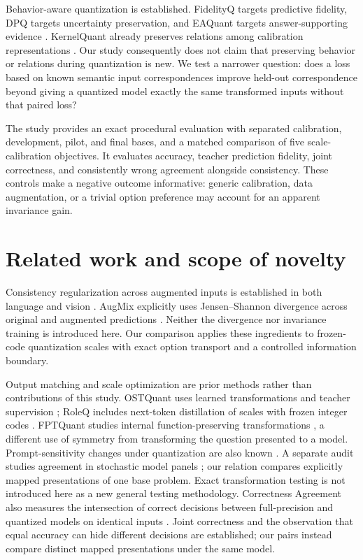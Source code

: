 \documentclass[11pt]{article}
\begin{document}
Behavior-aware quantization is established. FidelityQ targets predictive
fidelity, DPQ targets uncertainty preservation, and EAQuant targets
answer-supporting evidence \cite{fidelityq,dpq,eaquant}. KernelQuant already
preserves relations among calibration representations \cite{kernelquant}.
Our study consequently does not claim that preserving behavior or relations
during quantization is new. We test a narrower question: does a loss based
on known semantic input correspondences improve held-out correspondence
beyond giving a quantized model exactly the same transformed inputs without
that paired loss?

The study provides an exact procedural evaluation with separated calibration,
development, pilot, and final bases, and a matched comparison of five
scale-calibration objectives. It evaluates accuracy, teacher prediction
fidelity, joint correctness, and consistently wrong agreement alongside
consistency. These controls make a negative outcome informative: generic
calibration, data augmentation, or a trivial option preference may account
for an apparent invariance gain.

\section{Related work and scope of novelty}
Consistency regularization across augmented inputs is established in both
language and vision \cite{uda}. AugMix explicitly uses Jensen--Shannon
divergence across original and augmented predictions \cite{augmix}.
Neither the divergence nor invariance training is introduced here.
Our comparison applies these ingredients to frozen-code quantization scales
with exact option transport and a controlled information boundary.

Output matching and scale optimization are prior methods rather than
contributions of this study. OSTQuant uses learned transformations and
teacher supervision \cite{ostquant}; RoleQ includes next-token distillation
of scales with frozen integer codes \cite{roleq}. FPTQuant studies internal
function-preserving transformations \cite{fptquant}, a different use of
symmetry from transforming the question presented to a model.
Prompt-sensitivity changes under quantization are also known
\cite{deceptive}. A separate audit studies agreement in stochastic model
panels \cite{panels}; our relation compares explicitly mapped presentations
of one base problem. Exact transformation testing is not introduced here as
a new general testing methodology. Correctness Agreement also measures the
intersection of correct decisions between full-precision and quantized models
on identical inputs \cite{illusion}. Joint correctness and the observation
that equal accuracy can hide different decisions are established; our pairs
instead compare distinct mapped presentations under the same model.
\end{document}
